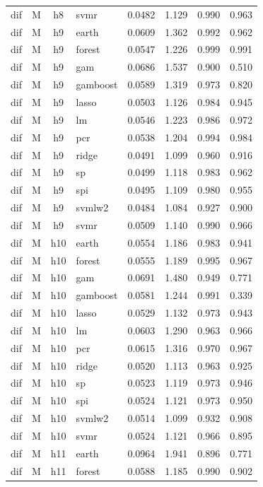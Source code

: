 \begin{ThreePartTable}
\begin{longtable}[t]{llclcccc}
dif & M & h8 & svmr & 0.0482 & 1.129 & 0.990 & 0.963\\
\addlinespace
dif & M & h9 & earth & 0.0609 & 1.362 & 0.992 & 0.962\\
dif & M & h9 & forest & 0.0547 & 1.226 & 0.999 & 0.991\\
dif & M & h9 & gam & 0.0686 & 1.537 & 0.900 & 0.510\\
dif & M & h9 & gamboost & 0.0589 & 1.319 & 0.973 & 0.820\\
dif & M & h9 & lasso & 0.0503 & 1.126 & 0.984 & 0.945\\
dif & M & h9 & lm & 0.0546 & 1.223 & 0.986 & 0.972\\
dif & M & h9 & pcr & 0.0538 & 1.204 & 0.994 & 0.984\\
dif & M & h9 & ridge & 0.0491 & 1.099 & 0.960 & 0.916\\
dif & M & h9 & sp & 0.0499 & 1.118 & 0.983 & 0.962\\
dif & M & h9 & spi & 0.0495 & 1.109 & 0.980 & 0.955\\
dif & M & h9 & svmlw2 & 0.0484 & 1.084 & 0.927 & 0.900\\
dif & M & h9 & svmr & 0.0509 & 1.140 & 0.990 & 0.966\\
\addlinespace
dif & M & h10 & earth & 0.0554 & 1.186 & 0.983 & 0.941\\
dif & M & h10 & forest & 0.0555 & 1.189 & 0.995 & 0.967\\
dif & M & h10 & gam & 0.0691 & 1.480 & 0.949 & 0.771\\
dif & M & h10 & gamboost & 0.0581 & 1.244 & 0.991 & 0.339\\
dif & M & h10 & lasso & 0.0529 & 1.132 & 0.973 & 0.943\\
dif & M & h10 & lm & 0.0603 & 1.290 & 0.963 & 0.966\\
dif & M & h10 & pcr & 0.0615 & 1.316 & 0.970 & 0.967\\
dif & M & h10 & ridge & 0.0520 & 1.113 & 0.963 & 0.925\\
dif & M & h10 & sp & 0.0523 & 1.119 & 0.973 & 0.946\\
dif & M & h10 & spi & 0.0524 & 1.121 & 0.973 & 0.950\\
dif & M & h10 & svmlw2 & 0.0514 & 1.099 & 0.932 & 0.908\\
dif & M & h10 & svmr & 0.0524 & 1.121 & 0.966 & 0.895\\
\addlinespace
dif & M & h11 & earth & 0.0964 & 1.941 & 0.896 & 0.771\\
dif & M & h11 & forest & 0.0588 & 1.185 & 0.990 & 0.902\\

\end{longtable}
\end{ThreePartTable}
